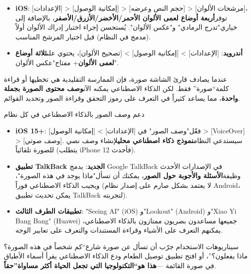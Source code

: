 
\begin{itemize}
  \item \textbf{iOS}: [الإعدادات] > [إمكانية الوصول] > [حجم النص وعرضه] > [مرشحات الألوان]، توفر\textbf{أربعة أوضاع لعمى الألوان الأحمر/الأخضر/الأزرق/الأصفر}، بالإضافة إلى خياري"تدرج الرمادي" و"عكس الألوان". يُستحسن إجراء اختبار إدراك الألوان أولاً (مدمج في النظام) قبل اختيار المرشح المناسب.
  \item \textbf{أندرويد}: [الإعدادات] > [إمكانية الوصول] > [تصحيح الألوان]، يحتوي على\textbf{ثلاثة أوضاع لعمى الألوان}+ مفتاح"عكس الألوان".
\end{itemize}


عندما يصادف قارئ الشاشة صورة، فإن الممارسة التقليدية هي تخطيها أو قراءة كلمة“صورة” فقط. لكن الذكاء الاصطناعي يمكنه الآن\textbf{وصف محتوى الصورة بجملة واحدة}، مما يساعد كثيراً في التعرف على رموز التحقق وقراءة الصور وتحديد القوائم.

\begin{tcbinfo}{دعم وصف الصور بالذكاء الاصطناعي في كل نظام}
\begin{itemize}
  \item \textbf{iOS 15+}: فعّل"وصف الصور" في [الإعدادات] > [إمكانية الوصول] > [VoiceOver] > [وصف صوتي]. سيستدعي النظام\textbf{نموذج ذكاء اصطناعي محلي}لإنشاء وصف نصي للصورة تلقائياً (يتطلب iPhone 12 فأحدث).
  \item \textbf{تطبيق TalkBack الجديد}: يدمج Google TalkBack في الإصدارات الأحدث وظيفة\textbf{الأسئلة والأجوبة حول الصور}، يمكنك أن تسأل"ماذا يوجد في هذه الصورة"، ويجيب الذكاء الاصطناعي فوراً (لا يعتمد بشكل صارم على إصدار نظام Android، يمكن تحديث تطبيق TalkBack لتجربته).
  \item \textbf{تطبيقات الطرف الثالث}: "Seeing AI" (iOS) و"Lookout" (Android) و"Xiao Yi Bang Bang" (Huawei) جميعها مساعدون بصريون ممتازون بالذكاء الاصطناعي، يمكنهم التعرف على الأشياء وقراءة المستندات والتعرف على تعابير الوجه.
\end{itemize}

\end{tcbinfo}

\begin{tcbpractice}{سيناريوهات الاستخدام}
جرّب أن تسأل عن صورة شارع“كم شخصاً في هذه الصورة؟ ماذا يفعلون؟”، أو افتح تطبيق توصيل الطعام ودع الذكاء الاصطناعي يقرأ أسماء الأطباق في صورة القائمة —\textbf{هذا هو“التكنولوجيا التي تجعل الحياة أكثر مساواة”حقاً}.

\end{tcbpractice}

